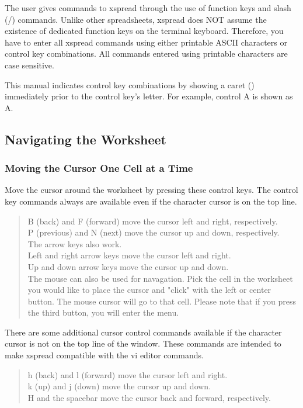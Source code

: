     The user gives commands to xspread through the use of function keys and 
slash (/) commands.  Unlike other spreadsheets, xspread does NOT assume the 
existence of dedicated function keys on the terminal keyboard.  Therefore, you 
have to enter all xspread commands using either printable ASCII characters or 
control key combinations.  All commands entered using printable characters are 
case sensitive.

    This manual indicates control key combinations by showing a caret (\ctrl ) 
immediately prior to the control key's letter.  For example, control A is 
shown as \ctrl A.

\subsection*{Navigating the Worksheet}

\subsubsection*{Moving the Cursor One Cell at a Time}

    Move the cursor around the worksheet by pressing these control keys.  The 
control key commands always are available even if the character cursor is on 
the top line.
\begin{quote}
    \ctrl B (back) and \ctrl F (forward) move the cursor left and right, respectively.\\
    \ctrl P (previous) and \ctrl N (next) move the cursor up and down, 
      respectively.\\

    The arrow keys also work.\\
    Left and right arrow keys move the cursor left and right.\\
    Up and down arrow keys move the cursor up and down.\\
    The mouse can also be used for navagation.  Pick the cell in the worksheet you
    would like to place the cursor and "click" with the left or center button.  The
    mouse cursor will go to that cell.  Please note that if you press the third
    button, you will enter the menu.\\
\end{quote}

    There are some additional cursor control commands available if the 
character cursor is not on the top line of the window.  These commands are 
intended to make xspread compatible with the vi editor commands.
\begin{quote}
    h (back) and l (forward) move the cursor left and right.\\
    k (up) and j (down) move the cursor up and down.\\
    \ctrl H and the spacebar move the cursor back and forward, respectively.\\
\end{quote}

